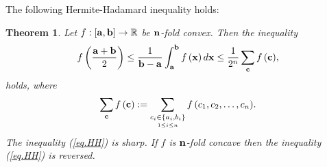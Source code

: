 \documentclass{amsart}
\newtheorem{theorem}{Theorem}
\theoremstyle{plain}
\numberwithin{equation}{section}
\begin{document}
The following Hermite-Hadamard inequality holds:
\begin{theorem}
\label{thm2}Let $f:\left[ {{\bf{a}},{\bf{b}}} \right] \to
\mathbb{R}$ be ${\bf{n}}$-fold convex. Then the inequality
\begin{align}
\label{eq.HH}f\left( {\frac{{{\bf{a}} + {\bf{b}}}}{2}} \right) \le
\frac{1}{{{\bf{b}} - {\bf{a}}}}\int_{\bf{a}}^{\bf{b}} {f\left(
{\bf{x}} \right)d{\bf{x}}}  \le \frac{1}{{2^n
}}\sum\limits_{\bf{c}} {f\left( {\bf{c}} \right)},
\end{align}
holds, where
\begin{align*}
\sum\limits_{\bf{c}} {f\left( {\bf{c}} \right)} : =
\sum\limits_{\mathop {c_i  \in \left\{ {a_i ,b_i }
\right\}}\limits_{1 \le i \le n} } {f\left( {c_1, c_2, \ldots ,c_n
} \right)}.
\end{align*}
The inequality (\ref{eq.HH}) is sharp. If $f$ is ${\bf{n}}$-fold
concave then the inequality (\ref{eq.HH}) is reversed.
\end{theorem}
\end{document}
